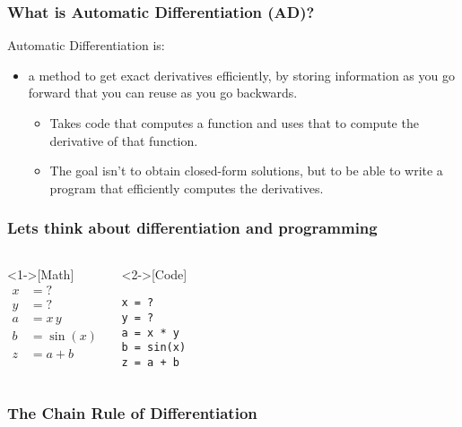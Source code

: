 \documentclass{beamer}
\begin{document}
\begin{frame}
	\frametitle{What is Automatic Differentiation (AD)?}

	Automatic Differentiation is:
	\begin{itemize}
		\item a method to get exact derivatives efficiently, by storing information as you go forward that you can reuse as you go backwards.
		\begin{itemize}
			\item Takes code that computes a function and uses that to compute the derivative of that function.
		\item The goal isn't to obtain closed-form solutions, but to be able to write a program that efficiently computes the derivatives.
		\end{itemize}
	\end{itemize}
\end{frame}

\begin{frame}[fragile]
\frametitle{Lets think about differentiation and programming}
\begin{columns}
    \begin{example}<1->[Math] 
    \vspace{-1.5em}
    \begin{align*}
			x & = ? \\
			y & = ? \\
			a & = x \, y \\
			b & = \sin(x) \\
			z & = a + b
		\end{align*}
    \end{example}

	\begin{example}<2->[Code]
			\begin{lstlisting}
x = ?
y = ?
a = x * y
b = sin(x)
z = a + b
			\end{lstlisting}
	\end{example}
	\end{columns}
\end{frame}

\begin{frame}
\frametitle{The Chain Rule of Differentiation}


\end{frame}
\end{document}
